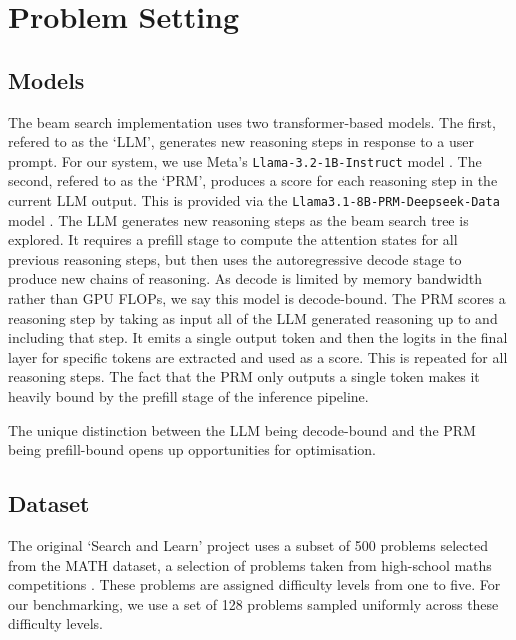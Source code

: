 \documentclass[12pt,twoside]{report}
\begin{document}
\section{Problem Setting}
\subsection{Models}
The beam search implementation uses two transformer-based models.
The first, refered to as the `LLM', generates new reasoning steps in response to a user prompt. 
For our system, we use Meta's \texttt{Llama-3.2-1B-Instruct} model \cite{grattafiori2024llama}.
The second, refered to as the `PRM', produces a score for each reasoning step in the current LLM output. 
This is provided via the \texttt{Llama3.1-8B-PRM-Deepseek-Data} model \cite{dong2024rlhf} \cite{ArmoRM} \cite{xiong2024iterative}.
The LLM generates new reasoning steps as the beam search tree is explored. 
It requires a prefill stage to compute the attention states for all previous reasoning steps, but then uses the autoregressive decode stage to produce new chains of reasoning. 
As decode is limited by memory bandwidth rather than GPU FLOPs, we say this model is decode-bound. %
The PRM scores a reasoning step by taking as input all of the LLM generated reasoning up to and including that step.
It emits a single output token and then the logits in the final layer for specific tokens are extracted and used as a score.
This is repeated for all reasoning steps.
The fact that the PRM only outputs a single token makes it heavily bound by the prefill stage of the inference pipeline.

The unique distinction between the LLM being decode-bound and the PRM being prefill-bound opens up opportunities for optimisation. %


\subsection{Dataset}
The original `Search and Learn' project uses a subset of 500 problems selected from the MATH dataset, a selection of problems taken from high-school maths competitions \cite{hendrycks2021measuring}.
These problems are assigned difficulty levels from one to five.
For our benchmarking, we use a set of 128 problems sampled uniformly across these difficulty levels.
\end{document}
